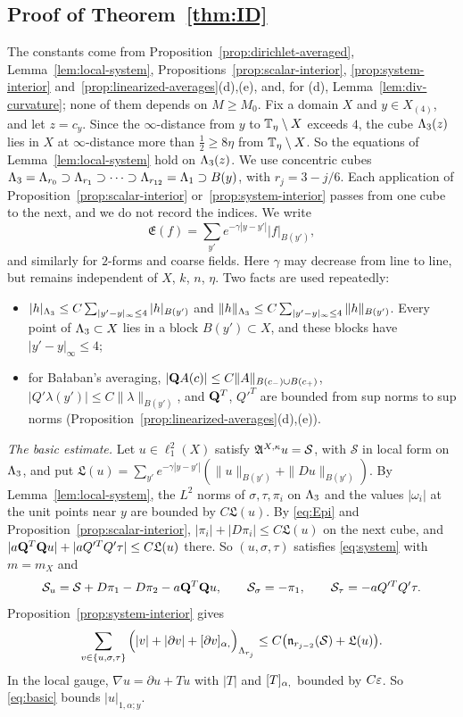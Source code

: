 \subsection{Proof of Theorem~\ref{thm:ID}}

The constants come from Proposition~\ref{prop:dirichlet-averaged}, Lemma~\ref{lem:local-system}, Propositions~\ref{prop:scalar-interior}, \ref{prop:system-interior} and~\ref{prop:linearized-averages}(d),(e), and, for (d), Lemma~\ref{lem:div-curvature}; none of them depends on $M\ge M_0$. Fix a domain $X$ and $y\in X_{(4)}$, and let $z=c_y$. Since the $\infty$-distance from $y$ to $\mathbb T_\eta\setminus X$ exceeds $4$, the cube $\Lambda_3(z)$ lies in $X$ at $\infty$-distance more than $\frac12\ge8\eta$ from $\mathbb T_\eta\setminus X$. So the equations of Lemma~\ref{lem:local-system} hold on $\Lambda_3(z)$. We use concentric cubes $\Lambda_3=\Lambda_{r_0}\supset\Lambda_{r_1}\supset\dots\supset\Lambda_{r_{12}}=\Lambda_1\supset B(y)$, with $r_j=3-j/6$. Each application of Proposition~\ref{prop:scalar-interior} or~\ref{prop:system-interior} passes from one cube to the next, and we do not record the indices. We write
\[
\mathfrak E(f)=\sum_{y'}e^{-\gamma|y-y'|}|f|_{B(y')},
\]
and similarly for $2$-forms and coarse fields. Here $\gamma$ may decrease from line to line, but remains independent of $X$, $k$, $n$, $\eta$. Two facts are used repeatedly:
\begin{itemize}
\item $|h|_{\Lambda_3}\le C\sum_{|y'-y|_\infty\le4}|h|_{B(y')}$ and $\|h\|_{\Lambda_3}\le C\sum_{|y'-y|_\infty\le4}\|h\|_{B(y')}$. Every point of $\Lambda_3\subset X$ lies in a block $B(y')\subset X$, and these blocks have $|y'-y|_\infty\le4$;
\item for Ba\l aban's averaging, $|\mathbf Q A(c)|\le C\|A\|_{B(c_-)\cup B(c_+)}$, $|Q'\lambda(y')|\le C\|\lambda\|_{B(y')}$, and $\mathbf Q^T$, $Q'^T$ are bounded from sup norms to sup norms (Proposition~\ref{prop:linearized-averages}(d),(e)).
\end{itemize}

\emph{The basic estimate.} Let $u\in\ell^2_1(X)$ satisfy $\mathfrak A^{X,\kappa}u=\mathcal S$, with $\mathcal S$ in local form on $\Lambda_3$, and put $\mathfrak L(u)=\sum_{y'}e^{-\gamma|y-y'|}(\|u\|_{B(y')}+\|Du\|_{B(y')})$. By Lemma~\ref{lem:local-system}, the $L^2$ norms of $\sigma,\tau,\pi_i$ on $\Lambda_3$ and the values $|\omega_i|$ at the unit points near $y$ are bounded by $C\mathfrak L(u)$. By \eqref{eq:Epi} and Proposition~\ref{prop:scalar-interior}, $|\pi_i|+|D\pi_i|\le C\mathfrak L(u)$ on the next cube, and $|a\mathbf Q^T\mathbf Q u|+|aQ'^TQ'\tau|\le C\mathfrak L(u)$ there. So $(u,\sigma,\tau)$ satisfies \eqref{eq:system} with $m=m_X$ and
\[
\mathcal S_u=\mathcal S+D\pi_1-D\pi_2-a\mathbf Q^T\mathbf Q u,\qquad\mathcal S_\sigma=-\pi_1,\qquad\mathcal S_\tau=-aQ'^TQ'\tau .
\]
Proposition~\ref{prop:system-interior} gives
\begin{equation}\label{eq:basic}
\sum_{v\in\{u,\sigma,\tau\}}\Big(|v|+|\partial v|+[\partial v]_{\alpha,}\Big)_{\Lambda_{r_j}}\le C\big(\mathfrak n_{r_{j-2}}(\mathcal S)+\mathfrak L(u)\big).
\end{equation}
In the local gauge, $\nabla u=\partial u+Tu$ with $|T|$ and $[T]_{\alpha,}$ bounded by $C\varepsilon$. So \eqref{eq:basic} bounds $|u|_{1,\alpha;y}$.

